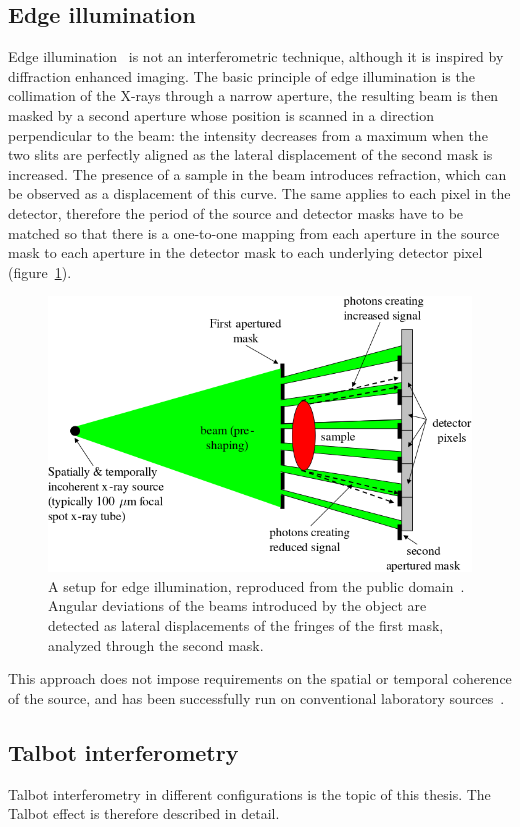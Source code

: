 \subsection{Edge illumination}
Edge illumination~\parencite{Olivo2001} is not an interferometric technique, although it is
inspired by diffraction enhanced imaging. The basic principle of edge
illumination is the collimation of the X-rays through a narrow aperture,
the resulting beam is then masked by a second aperture whose position is
scanned in a direction perpendicular to the beam: the intensity decreases from a
maximum when the two slits are perfectly aligned as the lateral displacement
of the second mask is increased.
The presence of a sample in the beam introduces refraction, which can be
observed as a displacement of this curve. The same applies to each pixel in
the detector, therefore the period of the source and detector masks have to
be matched so that there is a one-to-one mapping from each aperture in the
source mask to each aperture in the detector mask to each underlying
detector pixel (figure~\ref{fig:edge-illumination}).

\begin{figure}[htb]
    \centering
    \includegraphics[width=.7\textwidth]{gfx/edgeillumination.png}
    \caption[Edge illumination.]{A setup for edge illumination, reproduced
        from the public domain~\parencite{edge-illumination-picture}. Angular
        deviations of the beams introduced by the object are detected as
        lateral displacements of the fringes of the first mask, analyzed
        through the second mask.}
    \label{fig:edge-illumination}
\end{figure}

This approach does not impose requirements on the spatial or temporal
coherence of the source, and has been successfully run on conventional
laboratory sources~\parencite{Olivo2007}.

\subsection{Talbot interferometry}\label{sec:talbot-interferometry}
Talbot interferometry in different configurations is the topic of this
thesis. The Talbot effect is therefore described in detail.

